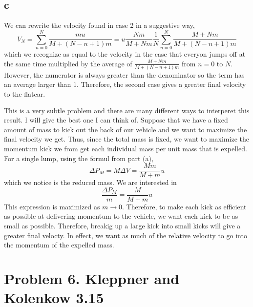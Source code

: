 \documentclass[11pt]{article}
\begin{document}
\subsection*{c}
We can rewrite the velocity found in case 2 in a suggestive way,
\[V_N =  \sum_{n = 0}^{N} \frac{mu}{M + (N - n + 1)m} = u \frac{Nm}{M + Nm} \frac{1}{N} \sum_{n = 0}^{N} \frac{M + N m}{M + (N - n + 1)m}\]
which we recognize as equal to the velocity in the case that everyon jumps off at the same time multiplied by the average of $\frac{M + N m}{M + (N - n + 1)m}$ from $n = 0$ to $N$. However, the numerator is always greater than the denominator so the term has an average larger than $1$. Therefore, the second case gives a greater final velocity to the flatcar. 

This is a very subtle problem and there are many different ways to interperet this result. I will give the best one I can think of. Suppose that we have a fixed amount of mass to kick out the back of our vehicle and we want to maximize the final velocity we get. Thus, since the total mass is fixed, we want to maximize the momentum kick we from get each individual mass per unit mass that is expelled. For a single lump, using the formul from part (a),
\[\Delta P_M  = M \Delta V = \frac{Mm}{M + m} u\] which we notice is the reduced mass. We are interested in \[\frac{\Delta P_M}{m} = \frac{M}{M + m} u\] This expression is maximized as $m \to 0$. Therefore, to make each kick as efficient as possible at delivering momentum to the vehicle, we want each kick to be as small as possible. Therefore, breakig up a large kick into small kicks will give a greater final velocty. In effect, we want as much of the relative velocity to go into the momentum of the expelled mass.  

\section*{Problem 6. Kleppner and Kolenkow 3.15}
\end{document}

